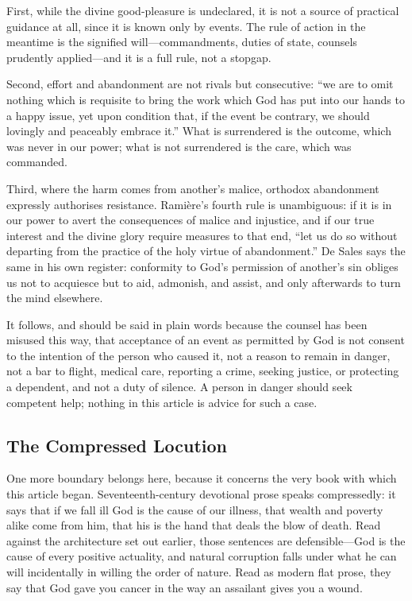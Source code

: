 First, while the divine good-pleasure is undeclared, it is not a source of practical guidance at all, since it is known only by events. The rule of action in the meantime is the signified will---commandments, duties of state, counsels prudently applied---and it is a full rule, not a stopgap.

Second, effort and abandonment are not rivals but consecutive: ``we are to omit nothing which is requisite to bring the work which God has put into our hands to a happy issue, yet upon condition that, if the event be contrary, we should lovingly and peaceably embrace it.'' What is surrendered is the outcome, which was never in our power; what is not surrendered is the care, which was commanded.

Third, where the harm comes from another's malice, orthodox abandonment expressly authorises resistance. Ramière's fourth rule is unambiguous: if it is in our power to avert the consequences of malice and injustice, and if our true interest and the divine glory require measures to that end, ``let us do so without departing from the practice of the holy virtue of abandonment.'' De Sales says the same in his own register: conformity to God's permission of another's sin obliges us not to acquiesce but to aid, admonish, and assist, and only afterwards to turn the mind elsewhere.

It follows, and should be said in plain words because the counsel has been misused this way, that acceptance of an event as permitted by God is not consent to the intention of the person who caused it, not a reason to remain in danger, not a bar to flight, medical care, reporting a crime, seeking justice, or protecting a dependent, and not a duty of silence. A person in danger should seek competent help; nothing in this article is advice for such a case.

\subsection{The Compressed Locution}

One more boundary belongs here, because it concerns the very book with which this article began. Seventeenth-century devotional prose speaks compressedly: it says that if we fall ill God is the cause of our illness, that wealth and poverty alike come from him, that his is the hand that deals the blow of death. Read against the architecture set out earlier, those sentences are defensible---God is the cause of every positive actuality, and natural corruption falls under what he can will incidentally in willing the order of nature. Read as modern flat prose, they say that God gave you cancer in the way an assailant gives you a wound.

